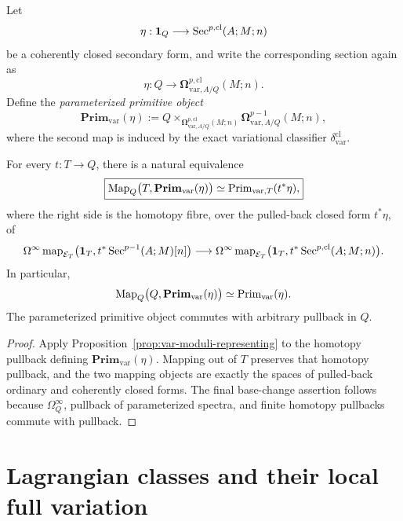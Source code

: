 \begin{definition}
\label{def:var-parameterized-primitive}
Let
\[
    \eta:\mathbf 1_Q\longrightarrow
    \operatorname{Sec}^{p,\mathrm{cl}}(A;M;n)
\]
be a coherently closed secondary form, and write the corresponding section again as
\[
    \eta:Q\longrightarrow
    \boldsymbol\Omega^{p,\mathrm{cl}}_{\mathrm{var},A/Q}(M;n).
\]
Define the \emph{parameterized primitive object}
\[
    \boxed{
    \mathbf{Prim}_{\mathrm{var}}(\eta)
    :=
    Q
    \times_{\boldsymbol\Omega^{p,\mathrm{cl}}_{\mathrm{var},A/Q}(M;n)}
    \boldsymbol\Omega^{p-1}_{\mathrm{var},A/Q}(M;n),
    }
\]
where the second map is induced by the exact variational classifier
\(\delta^{\mathrm{cl}}_{\mathrm{var}}\).
\end{definition}

\begin{proposition}
\label{prop:var-parameterized-primitive}
For every \(t:T\to Q\), there is a natural equivalence
\[
    \boxed{
    \operatorname{Map}_Q\bigl(T,\mathbf{Prim}_{\mathrm{var}}(\eta)\bigr)
    \simeq
    \operatorname{Prim}_{\mathrm{var},T}(t^*\eta),
    }
\]
where the right side is the homotopy fibre, over the pulled-back closed form \(t^*\eta\), of
\[
    \Omega^\infty
    \operatorname{map}_{\mathcal E_T}
    \bigl(\mathbf 1_T,t^*\operatorname{Sec}^{p-1}(A;M)[n]\bigr)
    \longrightarrow
    \Omega^\infty
    \operatorname{map}_{\mathcal E_T}
    \bigl(\mathbf 1_T,t^*\operatorname{Sec}^{p,\mathrm{cl}}(A;M;n)\bigr).
\]
In particular,
\[
    \operatorname{Map}_Q\bigl(Q,\mathbf{Prim}_{\mathrm{var}}(\eta)\bigr)
    \simeq
    \operatorname{Prim}_{\mathrm{var}}(\eta).
\]
The parameterized primitive object commutes with arbitrary pullback in \(Q\).
\end{proposition}

\begin{proof}
Apply Proposition~\ref{prop:var-moduli-representing} to the homotopy pullback defining
\(\mathbf{Prim}_{\mathrm{var}}(\eta)\). Mapping out of \(T\) preserves that homotopy pullback, and the two mapping objects are exactly the spaces of pulled-back ordinary and coherently closed forms. The final base-change assertion follows because \(\Omega_Q^\infty\), pullback of parameterized spectra, and finite homotopy pullbacks commute with pullback.
\end{proof}

\section{Lagrangian classes and their local full variation}
\label{sec:var-lagrangians}

